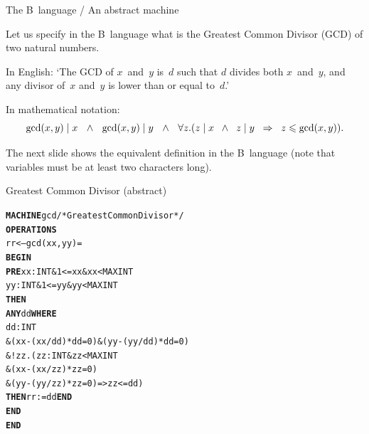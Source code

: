 \documentclass[compress,dvips,xcolor={dvipsnames},t]{beamer}
\begin{document}
%
\begin{frame}{The B~language / An abstract machine}

  Let us specify in the B~language what is the Greatest Common Divisor
  (GCD) of two natural numbers.

  \bigskip

  In English: `The GCD of \(x\)~and~\(y\) is~\(d\) such that \(d\)
  divides both \(x\)~and~\(y\), and any divisor of~\(x\) and~\(y\) is
  lower than or equal to~\(d\).'

  \bigskip

  In mathematical notation:
  \begin{equation*}
    \tiny
    \gcd(x,y) \mid x \quad\land\quad
    \gcd(x,y) \mid y \quad\wedge\quad
    \forall z.(z \mid x \;\;\wedge\;\; z \mid y
    \;\; \Rightarrow\;\; z \leqslant \gcd(x,y)).
  \end{equation*}

  The next slide shows the equivalent definition in the B~language
  (note that variables must be at least two characters long).

\end{frame}

%
\begin{frame}[fragile]{Greatest Common Divisor (abstract)}

\begin{alltt}
\small
\textbf{MACHINE} gcd /* Greatest Common Divisor */
\textbf{OPERATIONS}
  rr <-- gcd (xx,yy) =
    \textbf{BEGIN}
      \textbf{PRE} xx : INT \& 1 <= xx \& xx < MAXINT
          yy : INT \& 1 <= yy \& yy < MAXINT
      \textbf{THEN}
        \textbf{ANY} dd \textbf{WHERE}
         dd : INT
            \& (xx-(xx/dd)*dd = 0) \& (yy-(yy/dd)*dd = 0)
            \& !zz.(zz : INT \& zz < MAXINT
                   \& (xx-(xx/zz)*zz = 0)
                   \& (yy-(yy/zz)*zz = 0) => zz <= dd)
        \textbf{THEN} rr := dd \textbf{END}
      \textbf{END}
    \textbf{END}
\end{alltt}

\end{frame}
\end{document}
